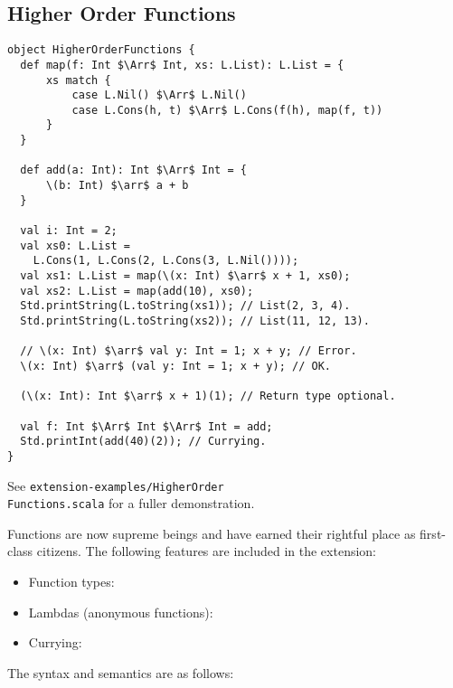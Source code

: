 \subsection{Higher Order Functions}

\begin{lstlisting}
object HigherOrderFunctions {
  def map(f: Int $\Arr$ Int, xs: L.List): L.List = {
      xs match {
          case L.Nil() $\Arr$ L.Nil()
          case L.Cons(h, t) $\Arr$ L.Cons(f(h), map(f, t))
      }
  }
  
  def add(a: Int): Int $\Arr$ Int = {
      \(b: Int) $\arr$ a + b
  }
  
  val i: Int = 2;
  val xs0: L.List =
    L.Cons(1, L.Cons(2, L.Cons(3, L.Nil())));
  val xs1: L.List = map(\(x: Int) $\arr$ x + 1, xs0);
  val xs2: L.List = map(add(10), xs0);
  Std.printString(L.toString(xs1)); // List(2, 3, 4).
  Std.printString(L.toString(xs2)); // List(11, 12, 13).

  // \(x: Int) $\arr$ val y: Int = 1; x + y; // Error.
  \(x: Int) $\arr$ (val y: Int = 1; x + y); // OK.

  (\(x: Int): Int $\arr$ x + 1)(1); // Return type optional.

  val f: Int $\Arr$ Int $\Arr$ Int = add;
  Std.printInt(add(40)(2)); // Currying.
}
\end{lstlisting}
See \texttt{extension-examples/HigherOrder\\Functions.scala} for a fuller demonstration.

Functions are now supreme beings and have earned their rightful place as first-class citizens. The following features are included in the extension:

\begin{itemize}
  \item Function types: 
  \item Lambdas (anonymous functions): \\
  \item Currying: 
\end{itemize}

\noindent
The syntax and semantics are as follows:

